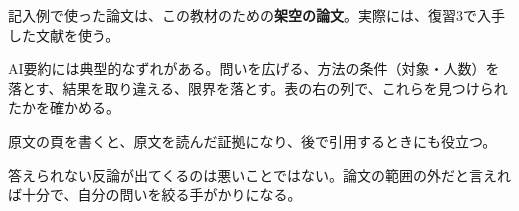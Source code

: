 \begin{point}
  \item 記入例で使った論文は、この教材のための\textbf{架空の論文}。実際には、復習3で入手した文献を使う。
  \item AI要約には典型的なずれがある。問いを広げる、方法の条件（対象・人数）を落とす、結果を取り違える、限界を落とす。表の右の列で、これらを見つけられたかを確かめる。
  \item 原文の頁を書くと、原文を読んだ証拠になり、後で引用するときにも役立つ。
  \item 答えられない反論が出てくるのは悪いことではない。論文の範囲の外だと言えれば十分で、自分の問いを絞る手がかりになる。
\end{point}
